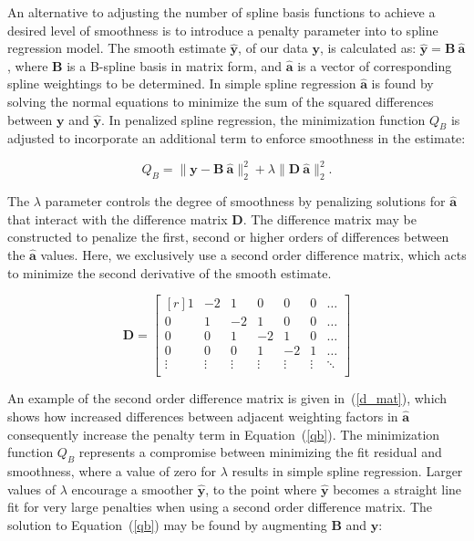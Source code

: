 \documentclass[num-refs]{wiley-article}
\begin{document}
An alternative to adjusting the number of spline basis functions to achieve a desired level of smoothness is to introduce a penalty parameter into to spline regression model. The smooth estimate $\hat{\mathbf{y}}$, of our data $\mathbf{y}$, is calculated as: $\hat{\mathbf{y}} = \mathbf{B} \ \hat{\mathbf{a}}$, where $\mathbf{B}$ is a B-spline basis in matrix form, and $\hat{\mathbf{a}}$ is a vector of corresponding spline weightings to be determined. In simple spline regression $\hat{\mathbf{a}}$ is found by solving the normal equations to minimize the sum of the squared differences between $\mathbf{y}$ and $\hat{\mathbf{y}}$. In penalized spline regression, the minimization function $Q_B$ is adjusted to incorporate an additional term to enforce smoothness in the estimate:

\begin{equation}
  Q_{B} = \|\mathbf{y} - \mathbf{B} \ \hat{\mathbf{a}} \|^{2}_{2} + \lambda \|\mathbf{D} \ \hat{\mathbf{a}}\|^{2}_{2}.
  \label{qb}
\end{equation}

The $\lambda$ parameter controls the degree of smoothness by penalizing solutions for $\hat{\mathbf{a}}$ that interact with the difference matrix $\mathbf{D}$. The difference matrix may be constructed to penalize the first, second or higher orders of differences between the $\hat{\mathbf{a}}$ values. Here, we exclusively use a second order difference matrix, which acts to minimize the second derivative of the smooth estimate.

\begin{equation}
  \mathbf{D} =
  \begin{bmatrix*}[r]
    1 & -2 &  1 &  0 &  0 &  0 & \dots \\
    0 &  1 & -2 &  1 &  0 &  0 & \dots \\
    0 &  0 &  1 & -2 &  1 &  0 & \dots \\
    0 &  0 &  0 &  1 & -2 &  1 & \dots \\
    \vdots & \vdots & \vdots & \vdots & \vdots & \vdots & \ddots \\
  \end{bmatrix*}
  \label{d_mat}
\end{equation}

An example of the second order difference matrix is given in~(\ref{d_mat}), which shows how increased differences between adjacent weighting factors in $\hat{\mathbf{a}}$ consequently increase the penalty term in Equation~(\ref{qb}). The minimization function $Q_{B}$ represents a compromise between minimizing the fit residual and smoothness, where a value of zero for $\lambda$ results in simple spline regression. Larger values of $\lambda$ encourage a smoother $\hat{\mathbf{y}}$, to the point where $\hat{\mathbf{y}}$ becomes a straight line fit for very large penalties when using a second order difference matrix. The solution to Equation~(\ref{qb}) may be found by augmenting $\mathbf{B}$ and $\mathbf{y}$:
\end{document}
